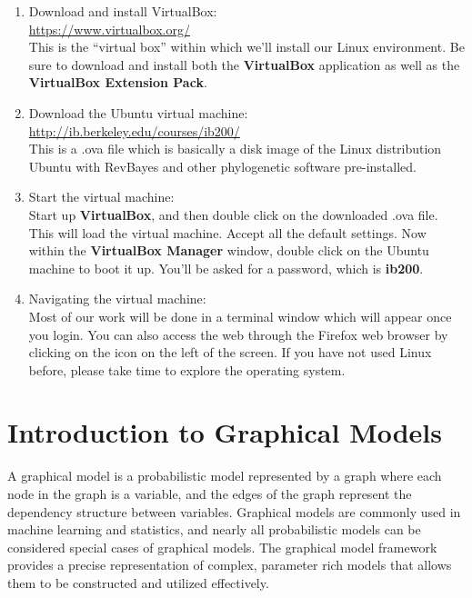 \documentclass[11pt]{article}
\begin{document}
\begin{enumerate}
  \item Download and install VirtualBox: \\
        \url{https://www.virtualbox.org/} \\
        This is the ``virtual box'' within which we'll install our Linux environment. 
        Be sure to download and install both the \textbf{VirtualBox} application 
        as well as the \textbf{VirtualBox Extension Pack}.
  \item Download the Ubuntu virtual machine: \\ 
        \url{http://ib.berkeley.edu/courses/ib200/} \\
        This is a .ova file which is basically a disk image of the Linux distribution Ubuntu
        with RevBayes and other phylogenetic software pre-installed.
  \item Start the virtual machine: \\ 
        Start up \textbf{VirtualBox}, and then double click on the downloaded .ova file.
        This will load the virtual machine. Accept all the default settings.
        Now within the \textbf{VirtualBox Manager} window, double click on the Ubuntu
        machine to boot it up. You'll be asked for a password, which is \textbf{ib200}.
  \item Navigating the virtual machine: \\
        Most of our work will be done in a terminal window which will
        appear once you login. You can also access the web through the Firefox
        web browser by clicking on the icon on the left of the screen.
        If you have not used Linux before, please take time to explore the operating system.
\end{enumerate}

\section{Introduction to Graphical Models}

A graphical model is a probabilistic model represented by a graph
where each node in the graph is a variable, and the edges of the graph represent
the dependency structure between variables.
Graphical models are commonly used in machine learning and statistics,
and nearly all probabilistic models can be considered special cases of graphical models.
The graphical model framework provides a precise representation
of complex, parameter rich models that allows them
to be constructed and utilized effectively.
\end{document}
